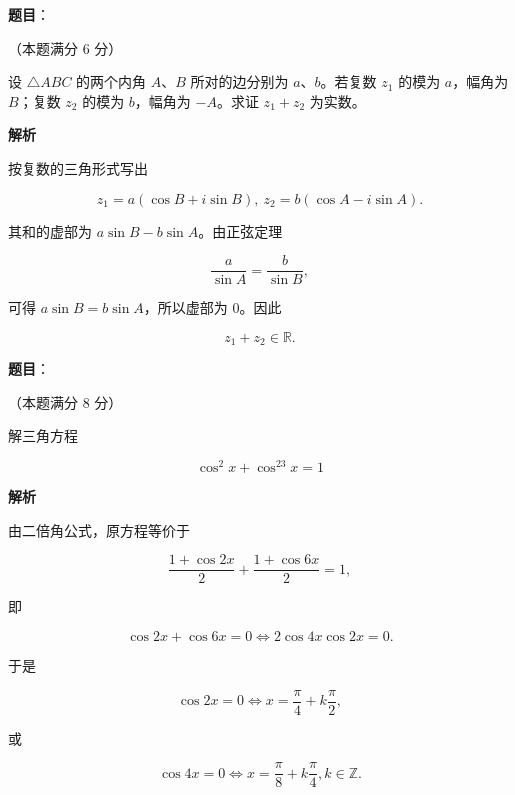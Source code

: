 \begin{answer}

\textbf{题目}：

（本题满分 6 分）

设 $\triangle ABC$ 的两个内角 $A\text{、}B$ 所对的边分别为 $a\text{、}b$。若复数 $z_1$ 的模为 $a$，幅角为 $B$；复数 $z_2$ 的模为 $b$，幅角为 $-A$。求证 $z_1+z_2$ 为实数。

\textbf{解析}

按复数的三角形式写出

\nopagebreak[4]
\[
z_1=a(\cos B+i\sin B),\ z_2=b(\cos A-i\sin A).
\]

其和的虚部为 $a\sin B-b\sin A$。由正弦定理

\nopagebreak[4]
\[
\frac a{\sin A}=\frac b{\sin B},
\]

可得 $a\sin B=b\sin A$，所以虚部为 0。因此

\nopagebreak[4]
\[
z_1+z_2\in\mathbb R.
\]


\end{answer}
\begin{answer}

\textbf{题目}：

（本题满分 8 分）

解三角方程

\nopagebreak[4]
\[
\cos^2x+\cos^23x=1
\]

\textbf{解析}

由二倍角公式，原方程等价于

\nopagebreak[4]
\[
\frac{1+\cos2x}{2}+\frac{1+\cos6x}{2}=1,
\]

即

\nopagebreak[4]
\[
\cos2x+\cos6x=0
\Longleftrightarrow
2\cos4x\cos2x=0.
\]

于是

\nopagebreak[4]
\[
\cos2x=0\Longleftrightarrow x=\frac\pi4+k\frac\pi2,
\]

或

\nopagebreak[4]
\[
\cos4x=0\Longleftrightarrow x=\frac\pi8+k\frac\pi4,
k\in\mathbb Z.
\]


\end{answer}
